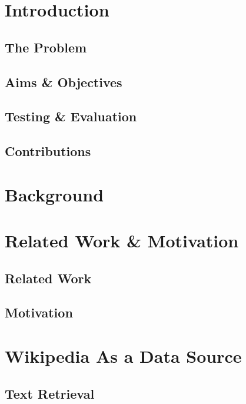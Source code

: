 \documentclass[12pt]{report}
\begin{document}
\maketitle

\tableofcontents

\chapter{Introduction}
        \section{The Problem}
        \section{Aims \& Objectives}
        \section{Testing \& Evaluation}
        \section{Contributions}
\chapter{Background}

\chapter{Related Work \& Motivation}
        \section{Related Work}
        \section{Motivation}

\chapter{Wikipedia As a Data Source}
        \section{Text Retrieval}
\end{document}
